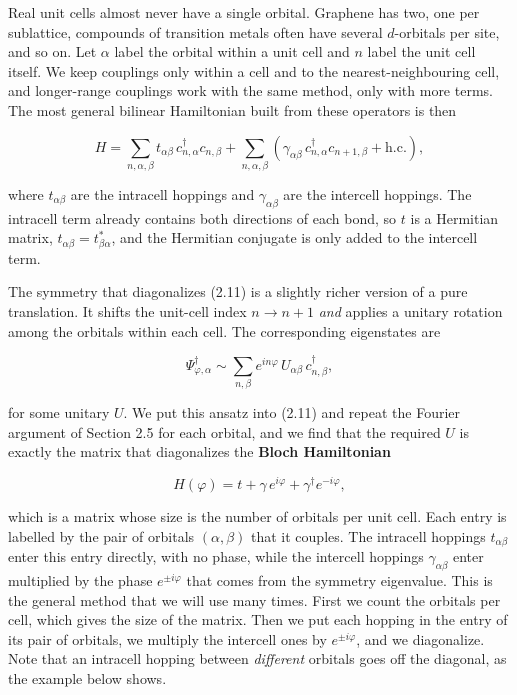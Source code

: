 Real unit cells almost never have a single orbital. Graphene has two, one per sublattice, compounds
of transition metals often have several $d$-orbitals per site, and so on. Let $\alpha$ label the
orbital within a unit cell and $n$ label the unit cell itself. We keep couplings only within a cell
and to the nearest-neighbouring cell, and longer-range couplings work with the same method, only
with more terms. The most general bilinear Hamiltonian built from these operators is then

\begin{equation}H = \sum_{n,\alpha,\beta} t_{\alpha\beta}\, c_{n,\alpha}^\dagger c_{n,\beta}
+ \sum_{n,\alpha,\beta} \left(\gamma_{\alpha\beta}\, c_{n,\alpha}^\dagger c_{n+1,\beta} + \text{h.c.}\right),
\end{equation}

where $t_{\alpha\beta}$ are the intracell hoppings and $\gamma_{\alpha\beta}$ are the intercell
hoppings. The intracell term already contains both directions of each bond, so $t$ is a Hermitian
matrix, $t_{\alpha\beta}=t_{\beta\alpha}^*$, and the Hermitian conjugate is only added to the
intercell term.

The symmetry that diagonalizes (2.11) is a slightly richer version of a pure translation. It shifts
the unit-cell index $n\to n+1$ \emph{and} applies a unitary rotation among the orbitals within each
cell. The corresponding eigenstates are

\begin{equation*}\Psi_{\varphi,\alpha}^\dagger \sim \sum_{n,\beta} e^{in\varphi}\,U_{\alpha\beta}\,c_{n,\beta}^\dagger,\end{equation*}

for some unitary $U$. We put this ansatz into (2.11) and repeat the Fourier argument of Section 2.5
for each orbital, and we find that the required $U$ is exactly the matrix that diagonalizes the
\textbf{Bloch Hamiltonian}

\begin{equation}H(\varphi) = t + \gamma\, e^{i\varphi} + \gamma^\dagger e^{-i\varphi},\end{equation}

which is a matrix whose size is the number of orbitals per unit cell. Each entry is labelled by the
pair of orbitals $(\alpha,\beta)$ that it couples. The intracell hoppings $t_{\alpha\beta}$ enter this
entry directly, with no phase, while the intercell hoppings $\gamma_{\alpha\beta}$ enter multiplied by
the phase $e^{\pm i\varphi}$ that comes from the symmetry eigenvalue. This is the general method that
we will use many times. First we count the orbitals per cell, which gives the size of the matrix.
Then we put each hopping in the entry of its pair of orbitals, we multiply the intercell ones by
$e^{\pm i\varphi}$, and we diagonalize. Note that an intracell hopping between \emph{different}
orbitals goes off the diagonal, as the example below shows.

